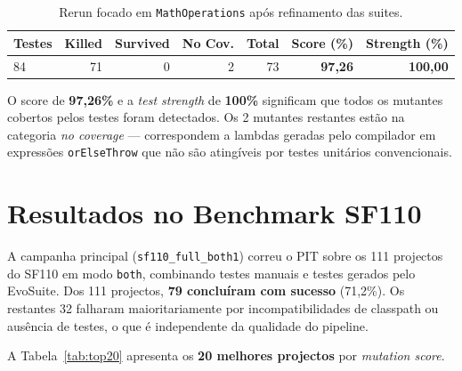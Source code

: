 \documentclass[12pt,a4paper]{article}
\begin{document}
\begin{table}[H]
  \centering
  \caption{Rerun focado em \texttt{MathOperations} após refinamento das suites.}
  \label{tab:rerun}
  \begin{tabular}{lrrrrrr}
    \toprule
    \textbf{Testes} & \textbf{Killed} & \textbf{Survived} &
    \textbf{No Cov.} & \textbf{Total} & \textbf{Score (\%)} & \textbf{Strength (\%)} \\
    \midrule
    84 & 71 & 0 & 2 & 73 & \textbf{97,26} & \textbf{100,00} \\
    \bottomrule
  \end{tabular}
\end{table}

O score de \textbf{97,26\%} e a \textit{test strength} de \textbf{100\%} significam que todos
os mutantes cobertos pelos testes foram detectados. Os 2 mutantes restantes estão na categoria
\textit{no coverage} --- correspondem a lambdas geradas pelo compilador em expressões
\texttt{orElseThrow} que não são atingíveis por testes unitários convencionais.

\section{Resultados no Benchmark SF110}

A campanha principal (\texttt{sf110\_full\_both1}) correu o PIT sobre os 111 projectos do SF110
em modo \texttt{both}, combinando testes manuais e testes gerados pelo EvoSuite.
Dos 111 projectos, \textbf{79 concluíram com sucesso} (71,2\%). Os restantes 32 falharam
maioritariamente por incompatibilidades de classpath ou ausência de testes, o que é independente
da qualidade do pipeline.

A Tabela~\ref{tab:top20} apresenta os \textbf{20 melhores projectos} por \textit{mutation score}.
\end{document}
